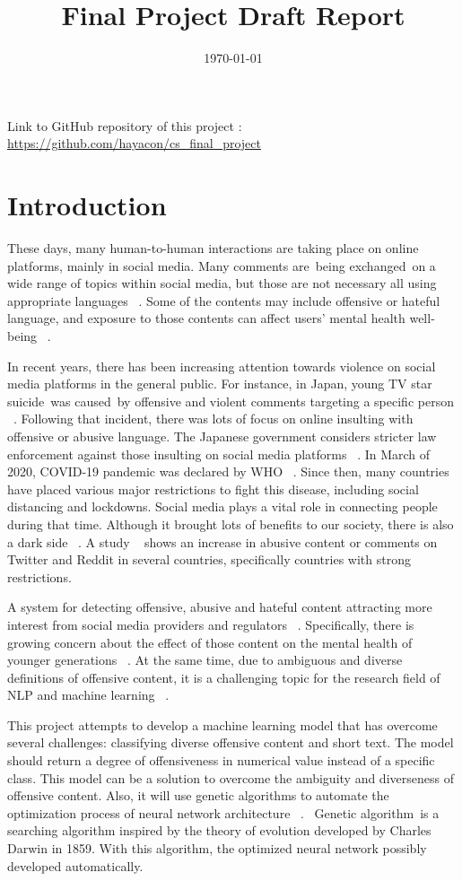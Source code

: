 \documentclass[11pt, natbib=false]{article}
\date{\today}
\title{Final Project Draft Report}
\begin{document}
\maketitle
Link to GitHub repository of this project : \url{https://github.com/hayacon/cs_final_project}
\section{Introduction}
These days, many human-to-human interactions are taking place on online platforms, mainly in social media.
Many comments are being exchanged on a wide range of topics within social media, but those are not necessary all using appropriate languages ~\cite{hada2021ruddit}.
Some of the contents may include offensive or hateful language, and exposure to those contents can affect users’ mental health well-being ~\cite{hada2021ruddit}.

In recent years, there has been increasing attention towards violence on social media platforms in the general public.
For instance, in Japan, young TV star suicide was caused by offensive and violent comments targeting a specific person ~\cite{HanaK}.
Following that incident, there was lots of focus on online insulting with offensive or abusive language. The Japanese government considers stricter law enforcement against those insulting on social media platforms ~\cite{JpGov}.
In March of 2020, COVID-19 pandemic was declared by WHO ~\cite{whoCovid}.
Since then, many countries have placed various major restrictions to fight this disease, including social distancing and lockdowns. Social media plays a vital role in connecting people during that time. Although it brought lots of benefits to our society, there is also a dark side ~\cite{liu2021covid}.
A study ~\cite{babvey2021using} shows an increase in abusive content or comments on Twitter and Reddit in several countries, specifically countries with strong restrictions.

A system for detecting offensive, abusive and hateful content attracting more interest from social media providers and regulators ~\cite{vidgen2019challenges}.
Specifically, there is growing concern about the effect of those content on the mental health of younger generations ~\cite{babvey2021using}.
At the same time, due to ambiguous and diverse definitions of offensive content, it is a challenging topic for the research field of NLP and machine learning ~\cite{vidgen2019challenges}.

This project attempts to develop a machine learning model that has overcome several challenges: classifying diverse offensive content and short text.
The model should return a degree of offensiveness in numerical value instead of a specific class.
This model can be a solution to overcome the ambiguity and diverseness of offensive content.
Also, it will use genetic algorithms to automate the optimization process of neural network architecture ~\cite{andersen2021evolving}. 
Genetic algorithm is a searching algorithm inspired by the theory of evolution developed by Charles Darwin in 1859.
With this algorithm, the optimized neural network possibly developed automatically.
\end{document}

